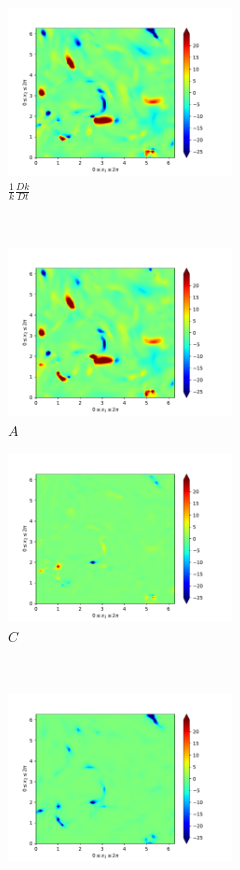 \begin{figure}[H]
    \begin{subfigure}[H]{0.45\textwidth}
        \includegraphics[height=1.75in]{media/run-cds-65/ke-1320}
        \caption{$\frac{1}{k} \frac{D k}{Dt}$}
    \end{subfigure}
    ~
    \begin{subfigure}{0.45\textwidth}
        \includegraphics[height=1.75in]{media/run-cds-65/A-ke-1320}
        \caption{$A$}
    \end{subfigure}
    \newline
    \begin{subfigure}{0.45\textwidth}
        \includegraphics[height=1.75in]{media/run-cds-65/C-ke-1320}
        \caption{$C$}
    \end{subfigure}
    ~
    \begin{subfigure}{0.45\textwidth}
        \includegraphics[height=1.75in]{media/run-cds-65/P-ke-1320}

\end{subfigure}
\end{figure}
